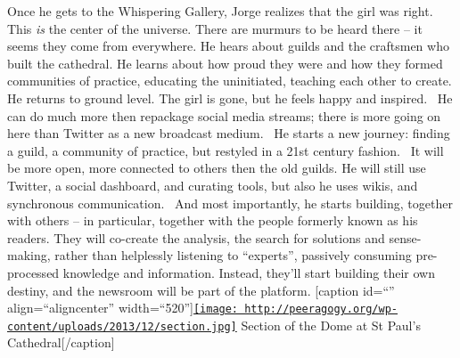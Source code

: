 Once he gets to the Whispering Gallery, Jorge realizes that the girl was
right. This \emph{is} the center of the universe. There are murmurs to
be heard there -- it seems they come from everywhere. He hears about
guilds and the craftsmen who built the cathedral. He learns about how
proud they were and how they formed communities of practice, educating
the uninitiated, teaching each other to create. He returns to ground
level. The girl is gone, but he feels happy and inspired.~ He can do
much more then repackage social media streams; there is more going on
here than Twitter as a new broadcast medium.~ He starts a new journey:
finding a guild, a community of practice, but restyled in a 21st century
fashion.~ It will be more open, more connected to others then the old
guilds. He will still use Twitter, a social dashboard, and curating
tools, but also he uses wikis, and synchronous communication.~ And most
importantly, he starts building, together with others -- in particular,
together with the people formerly known as his readers. They will
co-create the analysis, the search for solutions and sense-making,
rather than helplessly listening to ``experts'', passively consuming
pre-processed knowledge and information. Instead, they'll start building
their own destiny, and the newsroom will be part of the platform.
{[}caption id=``'' align=``aligncenter''
width=``520''{]}\href{http://peeragogy.org/a-story-of-beginnings/section/}{\texttt{[image: http://peeragogy.org/wp-content/uploads/2013/12/section.jpg]}}
Section of the Dome at St Paul's Cathedral{[}/caption{]}
